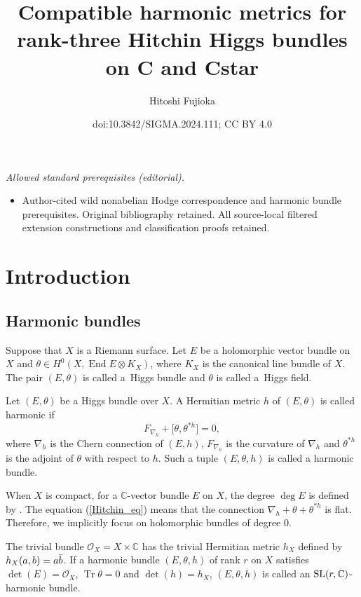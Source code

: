 \documentclass[10pt,a4paper]{amsart}
\title{Compatible harmonic metrics for rank-three Hitchin Higgs bundles on C and Cstar}
\author{Hitoshi Fujioka}
\date{doi:10.3842/SIGMA.2024.111; CC BY 4.0}
\numberwithin{equation}{section}
\newcommand{\C}{\mathbb{C}}
\newcommand{\End}{\operatorname{End}}
\newcommand{\Tr}{\operatorname{Tr}}
\newcommand{\strsheaf}{\mathcal{O}}
\begin{document}
\maketitle
\noindent\textit{Allowed standard prerequisites (editorial).}\begin{itemize}
\item Author-cited wild nonabelian Hodge correspondence and harmonic bundle prerequisites. Original bibliography retained. All source-local filtered extension constructions and classification proofs retained.
\end{itemize}\medskip
\section{Introduction}
\subsection{Harmonic bundles}
Suppose that $X$ is a Riemann surface. Let $E$ be a holomorphic vector bundle on $X$ and ${\theta\in H^0(X,\End{E}\otimes K_X)}$, where $K_X$ is the canonical line bundle of $X$. The pair $(E,\theta)$ is called a~Higgs bundle and $\theta$ is called a~Higgs field.
\begin{Definition}
 Let $(E,\theta)$ be a Higgs bundle over $X$. A Hermitian metric $h$ of $(E,\theta)$ is called harmonic if
 \begin{equation}\label{Hitchin_eq}
 F_{\nabla_h} + \bigl[\theta,\theta^{\ast h}\bigr] = 0,
 \end{equation}
 where $\nabla_h$ is the Chern connection of $(E,h)$, $F_{\nabla_h}$ is the curvature of $\nabla_h$ and $\theta^{\ast h}$ is the adjoint of $\theta$ with respect to $h$. Such a tuple $(E,\theta,h)$ is called a harmonic bundle.
\end{Definition}
\begin{Remark}
 When $X$ is compact, for a $\C$-vector bundle $E$ on $X$, the degree $\deg{E}$ is defined by .
 The equation (\ref{Hitchin_eq}) means that the connection $\nabla_h + \theta + \theta^{*h}$ is flat. Therefore, we implicitly focus on holomorphic bundles of degree 0.
\end{Remark}
The trivial bundle $\strsheaf_X = X\times \C$ has the trivial Hermitian metric $h_X$ defined by $h_X(a,b) = a\Bar{b}$. If a harmonic bundle $(E,\theta,h)$ of rank $r$ on $X$ satisfies $\det(E) = \strsheaf_X$, $\Tr{\theta}=0$ and $\det(h) = h_X$, $(E,\theta,h)$ is called an ${\rm SL}(r,\C)$-harmonic bundle.
\end{document}
